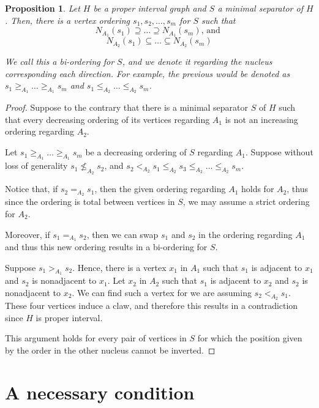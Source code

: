 \documentclass[12pt]{book}
\theoremstyle{plain}
\newtheorem{prop}[teo]{Proposition}
\theoremstyle{remark}
\begin{document}
\begin{prop} \label{PIC_p7}
	Let $H$ be a proper interval graph and $S$ a minimal separator of $H$. 
	Then, there is a vertex ordering $s_1, s_2, \ldots, s_m$ for $S$ such that
	$$ N_{A_1}(s_1) \supseteq \ldots \supseteq N_{A_1}(s_m) \mbox{, and }$$
	$$ N_{A_2}(s_1) \subseteq \ldots \subseteq  N_{A_2}(s_m) $$
	
	We call this a \emph{bi-ordering for $S$}, and we denote it regarding the nucleus corresponding each direction. 
	For example, the previous would be denoted as
	$s_1 \geq_{A_1} \ldots \geq_{A_1} s_m$ and $s_1 \leq_{A_2} \ldots \leq_{A_2} s_m$.
\end{prop}

\begin{proof}
	Suppose to the contrary that there is a minimal separator $S$ of $H$ such that every decreasing ordering of its vertices regarding $A_1$ is not an increasing ordering regarding $A_2$.
	
	Let $s_1 \geq_{A_1} \ldots \geq_{A_1} s_m$ be a decreasing ordering of $S$ regarding $A_1$.
	Suppose without loss of generality $s_1 \not\leq_{A_2} s_2$, and $s_2 <_{A_2} s_1 \leq_{A_2} s_3 \leq_{A_2} \ldots \leq_{A_2} s_m$.

	Notice that, if $s_2 =_{A_2} s_1$, then the given ordering regarding $A_1$ holds for $A_2$, thus
	since the ordering is total between vertices in $S$, we may assume a strict ordering for $A_2$.
	
	Moreover, if $s_1 =_{A_1} s_2$, then we can swap $s_1$ and $s_2$ in the ordering regarding $A_1$ and thus this new ordering results in a bi-ordering for $S$.
	
	\vspace{0.5mm}
	Suppose $s_1 >_{A_1} s_2$. Hence, there is a vertex $x_1$ in $A_1$ such that $s_1$ is adjacent to $x_1$ and $s_2$ is nonadjacent to $x_1$.
	Let $x_2$ in $A_2$ such that $s_1$ is adjacent to $x_2$ and $s_2$ is nonadjacent to $x_2$. 
	We can find such a vertex for we are assuming $s_2 <_{A_2} s_1$.
	These four vertices induce a claw, and therefore this results in a contradiction since $H$ is proper interval.
	
	\vspace{0.5mm}
	This argument holds for every pair of vertices in $S$ for which the position given by the order in the other nucleus cannot be inverted.	
\end{proof}


\section{A necessary condition} \label{section:teorema_completaciones}
\end{document}
